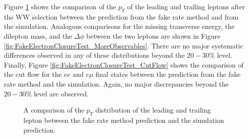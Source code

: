 Figure \ref{fig:FakeElectronClosureTest_LeptonPt} shows the comparison of the $p_{T}$
of the leading and trailing leptons after the WW selection between the prediction
from the fake rate method and from the simulation. Analogous comparisons for 
the missing transverse energy, the dilepton mass, and the $\Delta\phi$ between 
the two leptons are shown in Figure \ref{fig:FakeElectronClosureTest_MoreObservables}.
There are no major systematic differences observed in any of these distributions 
beyond the $20-30\%$ level. Finally, Figure \ref{fig:FakeElectronClosureTest_CutFlow}
shows the comparison of the cut flow for the $ee$ and $e\mu$ final states between
the prediction from the fake rate method and the simulation. Again, no major 
discrepancies beyond the $20-30\%$ level are observed. 


\begin{figure}[!htbp]
\begin{center}
\caption{A comparison of the $p_{T}$ distribution of the leading and trailing lepton
between the fake rate method prediction and the simulation prediction. }
\label{fig:FakeElectronClosureTest_LeptonPt}
\end{center}
\end{figure}

